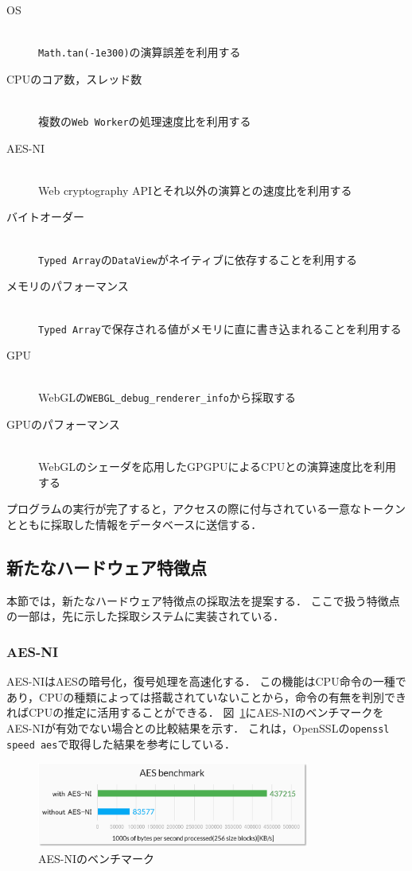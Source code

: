 \begin{description}
	\item[OS]\mbox{}\\
   	\texttt{Math.tan(-1e300)}の演算誤差を利用する~\cite{tor_mathtan}
    \item[CPUのコア数，スレッド数]\mbox{}\\
    複数の\texttt{Web Worker}の処理速度比を利用する~\cite{後藤浩行2013web,桐生直輝2014web}
    \item[AES-NI]\mbox{}\\
    Web cryptography APIとそれ以外の演算との速度比を利用する
    \item[バイトオーダー]\mbox{}\\
    \texttt{Typed Array}の\texttt{DataView}がネイティブに依存することを利用する
    \item[メモリのパフォーマンス]\mbox{}\\
    \texttt{Typed Array}で保存される値がメモリに直に書き込まれることを利用する
    \item[GPU]\mbox{}\\
    WebGLの\texttt{WEBGL\_debug\_renderer\_info}から採取する~\cite{mowery2012pixel}
    \item[GPUのパフォーマンス]\mbox{}\\
    WebGLのシェーダを応用したGPGPUによるCPUとの演算速度比を利用する
\end{description}

プログラムの実行が完了すると，アクセスの際に付与されている一意なトークンとともに採取した情報をデータベースに送信する．

\subsection{新たなハードウェア特徴点}
本節では，新たなハードウェア特徴点の採取法を提案する．
ここで扱う特徴点の一部は，先に示した採取システムに実装されている．

\subsubsection{AES-NI}
AES-NIはAESの暗号化，復号処理を高速化する．
この機能はCPU命令の一種であり，CPUの種類によっては搭載されていないことから，命令の有無を判別できればCPUの推定に活用することができる．
図~\ref{fig-aes_ni}にAES-NIのベンチマークをAES-NIが有効でない場合との比較結果を示す．
これは，OpenSSLの\texttt{openssl speed aes}で取得した結果を参考にしている．

\begin{figure}[H]
	\centering
    \includegraphics[width=0.8\textwidth,pagebox=artbox]{fig/aes_ni.png}
    \caption{AES-NIのベンチマーク}
    \label{fig-aes_ni}
\end{figure}

